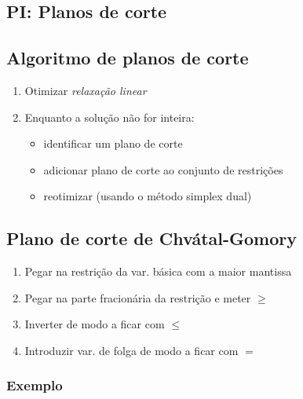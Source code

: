 \documentclass[10pt, a4paper]{article}
\begin{document}
\begin{multicols}{2}
\section{PI: Planos de corte}


\subsection{Algoritmo de planos de corte}

\begin{enumerate}
    \item Otimizar \textit{relaxação linear}
    \item Enquanto a solução não for inteira:
    \begin{itemize}
        \item identificar um plano de corte
        \item adicionar plano de corte ao conjunto de restrições
        \item reotimizar (usando o método simplex dual)
    \end{itemize}
\end{enumerate}

\subsection{Plano de corte de Chvátal-Gomory}

\begin{enumerate}
    \item Pegar na restrição da var. básica com a maior mantissa
    \item Pegar na parte fracionária da restrição e meter \(\ge\)
    \item Inverter de modo a ficar com \(\le\)
    \item Introduzir var. de folga de modo a ficar com \(=\)
\end{enumerate}

\subsubsection{Exemplo}


\end{multicols}
\end{document}
